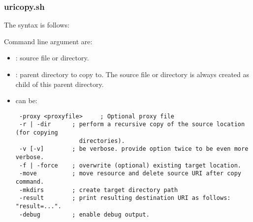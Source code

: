\subsubsection{uricopy.sh}
   
The  syntax is follows:  

\tab {}

Command line argument are: 
\begin{itemize}
  \item {} : source file or directory.
  \item \Path{  \lt dest URI\gt\ } : parent directory to copy to. The source
        file  or directory is always created as child of this parent
        directory.
  \item \Path{ [options] } can be: 

\hspace*{10mm}\begin{minipage}{170mm}
\begin{verbatim} 
 -proxy <proxyfile>     ; Optional proxy file
 -r | -dir      ; perform a recursive copy of the source location (for copying 
                  directories). 
 -v [-v]        ; be verbose. provide option twice to be even more verbose. 
 -f | -force    ; overwrite (optional) existing target location. 
 -move          ; move resource and delete source URI after copy command.
 -mkdirs        ; create target directory path 
 -result        ; print resulting destination URI as follows: "result=...".
 -debug         ; enable debug output.
\end{verbatim}
\end{minipage}
\end{itemize}

